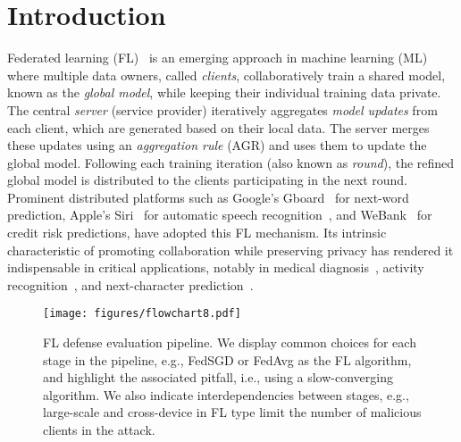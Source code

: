 \section{Introduction}\label{sec:introduction}
Federated learning (FL)~\cite{mcmahan2017communication} is an emerging approach in machine learning (ML) where multiple data owners, called \emph{clients}, collaboratively train a shared model, known as the \emph{global model}, while keeping their individual training data private.
The central \emph{server} (service provider) iteratively aggregates \emph{model updates} from each client, which are generated based on their local data. The server merges these updates using an \emph{aggregation rule} (AGR) and uses them to update the global model. Following each training iteration (also known as \emph{round}), the refined global model is distributed to the clients participating in the next round. Prominent distributed platforms such as Google's Gboard~\cite{gboard} for next-word prediction, Apple's Siri~\cite{technologyreviewApplePersonalizes} for automatic speech recognition~\cite{paulik2021federated}, and WeBank~\cite{webankcredit} for credit risk predictions, have adopted this FL mechanism. Its intrinsic characteristic of promoting collaboration while preserving privacy has rendered it indispensable in critical applications, notably in medical diagnosis~\cite{feki2021federated, ku2022privacy, qayyum2022collaborative}, activity recognition~\cite{zhao2022multimodal, ek2020evaluation, ouyang2021clusterfl, sozinov2018human}, and next-character prediction~\cite{sun2022fedsea}.


\begin{figure}
\centering
\texttt{[image: figures/flowchart8.pdf]}
\caption{
FL defense evaluation pipeline. We display common choices for each stage in the pipeline, e.g., FedSGD or FedAvg as the FL algorithm, and highlight the associated pitfall, i.e., using a slow-converging algorithm. We also indicate interdependencies between stages, e.g., large-scale and cross-device in FL type limit the number of malicious clients in the attack.
}
\label{fig:fl_flowchart}
\end{figure}

